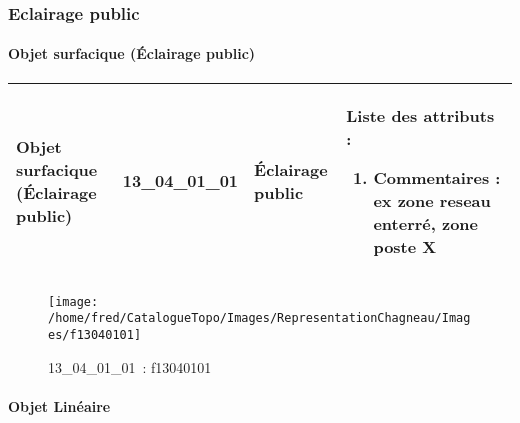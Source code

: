 \documentclass[12pt,titlepage]{book}
\begin{document}
\subsubsection{\large Eclairage public}
\paragraph{Objet surfacique (Éclairage public)}
\noindent
\vspace{\baselineskip}

\renewcommand{\arraystretch}{1.2}
\begin{supertabular}{|p{10cm}|c|p{13cm}|p{12cm}|}
 Objet surfacique (Éclairage public) & 13\_04\_01\_01 & Éclairage public & Liste des attributs :
\begin{enumerate}
  \item Commentaires : ex zone reseau enterré, zone poste X\end{enumerate}
\\
\hline
\end{supertabular}
\begin{figure}[h!]
  \hfill         %
  \begin{minipage}[t]{3cm}
    \begin{center}
      \texttt{[image: /home/fred/CatalogueTopo/Images/RepresentationChagneau/Images/f13040101]}
      \caption[~13\_04\_01\_01]{\small{13\_04\_01\_01~:} \tiny{f13040101}}\label{f13040101}
    \end{center}
  \end{minipage}
\end{figure}


\paragraph{Objet Linéaire}
\noindent
\vspace{\baselineskip}
\end{document}
